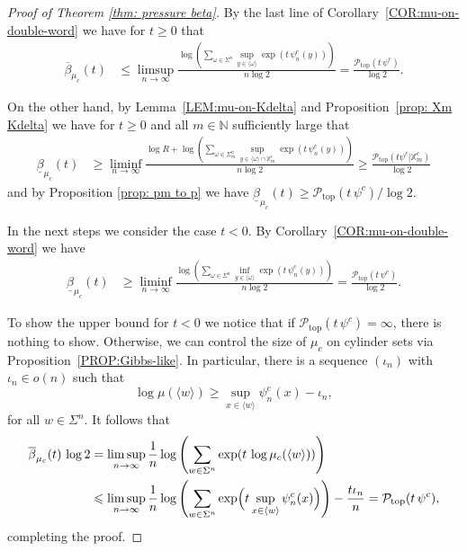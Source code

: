 \documentclass[11pt,reqno]{amsart}
\theoremstyle{plain}
\theoremstyle{definition}
\newcommand{\mc}{\mathcal}
\begin{document}
 
\begin{proof}[Proof of Theorem \ref{thm: pressure beta}]
 By the last line of Corollary~\ref{COR:mu-on-double-word} we have for $t\geqslant 0$ that 
 \begin{align*}
  \overline{\beta}_{\mu_c}(t)
  &\leqslant  \limsup_{n\to\infty} \frac{\log \left(\sum_{\omega\in\Sigma^n} \sup_{y\in \langle\omega\rangle} \exp\left(t\, \psi^c_n(y)\right)\right)}{n\log 2}
  = \frac{\mathcal{P}_{\operatorname{top}}(t\, \psi^c)}{\log 2}. 
 \end{align*}
 
 On the other hand, by Lemma~\ref{LEM:mu-on-Kdelta} and Proposition~\ref{prop: Xm Kdelta} we have for $t\geqslant 0$ and all $m\in\mathbb{N}$ sufficiently large that
 \begin{align*}
  \underline{\beta}_{\mu_{c}}(t)
   &\geqslant \liminf_{n\to\infty}
  \frac{\log R+\log \left(\sum_{\omega\in\Sigma^n_m} \sup_{y\in \langle\omega\rangle\cap \mathbb{X}_m^{c}} \exp\left(t\,\psi^c_n(y)\right)\right)}{n\log 2}
  \geqslant \frac{\mathcal{P}_{\operatorname{top}}(t\psi^{c}\vert\mathbb{X}_m^{c})}{\log 2}
 \end{align*}
 and by Proposition \ref{prop: pm to p} we have $\underline{\beta}_{\mu_c}(t)\geqslant \mathcal{P}_{\operatorname{top}}(t\,\psi^c)/\log 2$. 
 
 In the next steps we consider the case $t<0$. By Corollary~\ref{COR:mu-on-double-word} we have 
 \begin{align*}
   \underline{\beta}_{\mu_c}(t)
  &\geqslant  \liminf_{n\to\infty} \frac{\log \left(\sum_{\omega\in\Sigma^n} \inf_{y\in \langle\omega\rangle} \exp\left(t\, \psi^{c}_n(y)\right)\right)}{n\log 2}
  = \frac{\mathcal{P}_{\operatorname{top}}(t\, \psi^c)}{\log 2}. 
 \end{align*}

To show the upper bound for $t<0$ we notice that if
$\mc P_{\operatorname{top}}(t\, \psi^c) = \infty$, there is nothing to show. Otherwise, we can control the size of $\mu_{c}$ on cylinder sets via Proposition~\ref{PROP:Gibbs-like}. In particular, there is a sequence $(\iota_n)$ with $\iota_n \in o(n)$ such that
\[
\log \mu(\langle w \rangle) \geqslant \sup_{x \in \langle w \rangle} \psi^c_n(x) - \iota_n,
\]
for all $w \in \Sigma^n$. It follows that
\begin{align*}
 \overline{\beta}_{\mu_c}(t) \, \log 2 
& = \limsup_{n \to \infty} \frac{1}{n} \log \left( \sum_{w \in \Sigma^n} \exp(t\, \log \mu_{c}(\langle w \rangle))  \right)\\
& \leqslant \limsup_{n \to \infty} \frac{1}{n} \log
\left( \sum_{w \in \Sigma^n} \exp \Bigl(t \sup_{x \in \langle w \rangle}  \psi^c_n(x) \Bigr)\right) - \frac{t \iota_n}{n}
= \mc P_{\operatorname{top}}(t\, \psi^c),
\end{align*}
completing the proof.
\end{proof}
\end{document}
